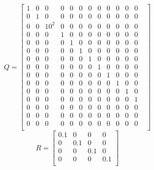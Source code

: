 $$
Q=\begin{bmatrix}
1 & 0 & 0 & 0 & 0 & 0 & 0 & 0 & 0 & 0 & 0 & 0 \\
0 & 1 & 0 & 0 & 0 & 0 & 0 & 0 & 0 & 0 & 0 & 0 \\
0 & 0 & 10^2 & 0 & 0 & 0 & 0 & 0 & 0 & 0 & 0 & 0 \\
0 & 0 & 0 & 1 & 0 & 0 & 0 & 0 & 0 & 0 & 0 & 0 \\
0 & 0 & 0 & 0 & 1 & 0 & 0 & 0 & 0 & 0 & 0 & 0 \\
0 & 0 & 0 & 0 & 0 & 1 & 0 & 0 & 0 & 0 & 0 & 0 \\
0 & 0 & 0 & 0 & 0 & 0 & 1 & 0 & 0 & 0 & 0 & 0 \\
0 & 0 & 0 & 0 & 0 & 0 & 0 & 1 & 0 & 0 & 0 & 0 \\
0 & 0 & 0 & 0 & 0 & 0 & 0 & 0 & 1 & 0 & 0 & 0  \\
0 & 0 & 0 & 0 & 0 & 0 & 0 & 0 & 0 & 1 & 0 & 0 & \\
0 & 0 & 0 & 0 & 0 & 0 & 0 & 0 & 0 & 0 & 1 & 0 & \\
0 & 0 & 0 & 0 & 0 & 0 & 0 & 0 & 0 & 0 & 0 & 1 & \\
0 & 0 & 0 & 0 & 0 & 0 & 0 & 0 & 0 & 0 & 0 & 0 & \\
0 & 0 & 0 & 0 & 0 & 0 & 0 & 0 & 0 & 0 & 0 & 0 & \\
0 & 0 & 0 & 0 & 0 & 0 & 0 & 0 & 0 & 0 & 0 & 0 & \\
\end{bmatrix}
$$
$$
R=\begin{bmatrix}
0.1 & 0 & 0 & 0 \\
0 & 0.1 & 0 & 0 \\
0 & 0 & 0.1 & 0 \\
0 & 0 & 0 & 0.1 \\
\end{bmatrix}
$$

